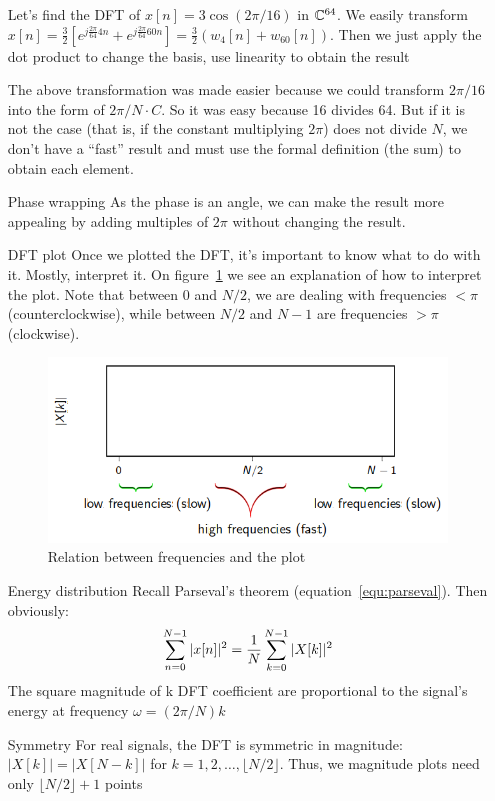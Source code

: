 \documentclass[11pt,a4paper]{article}
\begin{document}
\begin{itemize}
            \begin{example}
              Let's find the DFT of $x[n] = 3\cos(2\pi/16)$ in $\C^{64}$. We easily transform $x[n] = \frac{3}{2}\left[e^{j\frac{2\pi}{64}4n} + e^{j \frac{2\pi}{64}60n}\right] = \frac{3}{2}(w_4[n] + w_{60}[n])$. Then we just apply the dot product to change the basis, use linearity to obtain the result
            \end{example}
            \begin{example}
                The above transformation was made easier because we could transform $2\pi/16$ into the form of $2\pi/N \cdot C$. So it was easy because 16 divides 64. But if it is not the case (that is, if the constant multiplying $2\pi$) does not divide $N$, we don't have a ``fast'' result and must use the formal definition (the sum) to obtain each element. 
            \end{example}
    \item[Phase wrapping]As the phase is an angle, we can make the result more appealing by adding multiples of $2\pi$ without changing the result.
    \item[DFT plot]Once we plotted the DFT, it's important to know what to do with it. Mostly, interpret it. On figure\ \ref{fig_dft_interpret} we see an explanation of how to interpret the plot. Note that between 0 and $N/2$, we are dealing with frequencies $< \pi$ (counterclockwise), while between $N/2$ and $N-1$ are frequencies $> \pi$ (clockwise).
        \begin{figure}
            \centering%
            \includegraphics[scale=0.5]{images/dft_interpret}%
            \caption{Relation between frequencies and the plot}%
            \label{fig_dft_interpret}%
        \end{figure}
    \item[Energy distribution]Recall Parseval's theorem (equation\ \ref{equ:parseval}). Then obviously:
        \begin{equation}
            \somme{N-1}{n=0}|x[n]|^2 = \frac{1}{N}\somme{N-1}{k=0}|X[k]|^2
        \end{equation}
        The square magnitude of k DFT coefficient are proportional to the signal's energy at frequency $\omega = (2\pi/N)k$
    \item[Symmetry]For real signals, the DFT is symmetric in magnitude: ${|X[k]|=|X[N-k]|}$ for $k = 1,2,\ldots,\lfloor N/2 \rfloor$. Thus, we magnitude plots need only $\lfloor N/2 \rfloor +1$ points
\end{itemize}
\end{document}
